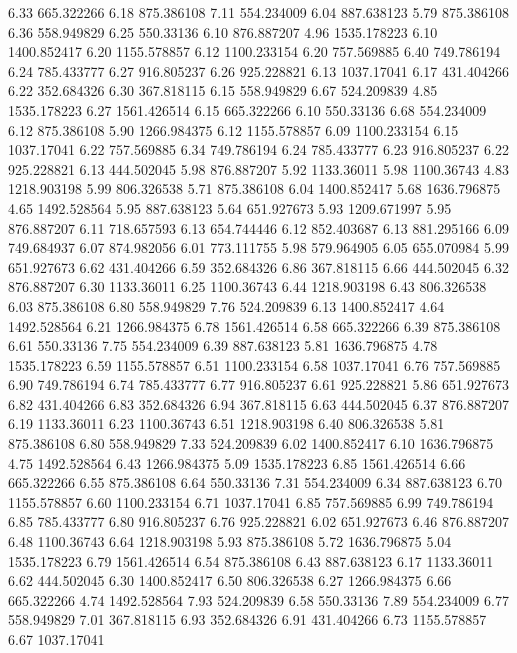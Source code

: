 6.33 	665.322266
6.18 	875.386108
7.11 	554.234009
6.04 	887.638123
5.79 	875.386108
6.36 	558.949829
6.25 	550.33136
6.10 	876.887207
4.96 	1535.178223
6.10 	1400.852417
6.20 	1155.578857
6.12 	1100.233154
6.20 	757.569885
6.40 	749.786194
6.24 	785.433777
6.27 	916.805237
6.26 	925.228821
6.13 	1037.17041
6.17 	431.404266
6.22 	352.684326
6.30 	367.818115
6.15 	558.949829
6.67 	524.209839
4.85 	1535.178223
6.27 	1561.426514
6.15 	665.322266
6.10 	550.33136
6.68 	554.234009
6.12 	875.386108
5.90 	1266.984375
6.12 	1155.578857
6.09 	1100.233154
6.15 	1037.17041
6.22 	757.569885
6.34 	749.786194
6.24 	785.433777
6.23 	916.805237
6.22 	925.228821
6.13 	444.502045
5.98 	876.887207
5.92 	1133.36011
5.98 	1100.36743
4.83 	1218.903198
5.99 	806.326538
5.71 	875.386108
6.04 	1400.852417
5.68 	1636.796875
4.65 	1492.528564
5.95 	887.638123
5.64 	651.927673
5.93 	1209.671997
5.95 	876.887207
6.11 	718.657593
6.13 	654.744446
6.12 	852.403687
6.13 	881.295166
6.09 	749.684937
6.07 	874.982056
6.01 	773.111755
5.98 	579.964905
6.05 	655.070984
5.99 	651.927673
6.62 	431.404266
6.59 	352.684326
6.86 	367.818115
6.66 	444.502045
6.32 	876.887207
6.30 	1133.36011
6.25 	1100.36743
6.44 	1218.903198
6.43 	806.326538
6.03 	875.386108
6.80 	558.949829
7.76 	524.209839
6.13 	1400.852417
4.64 	1492.528564
6.21 	1266.984375
6.78 	1561.426514
6.58 	665.322266
6.39 	875.386108
6.61 	550.33136
7.75 	554.234009
6.39 	887.638123
5.81 	1636.796875
4.78 	1535.178223
6.59 	1155.578857
6.51 	1100.233154
6.58 	1037.17041
6.76 	757.569885
6.90 	749.786194
6.74 	785.433777
6.77 	916.805237
6.61 	925.228821
5.86 	651.927673
6.82 	431.404266
6.83 	352.684326
6.94 	367.818115
6.63 	444.502045
6.37 	876.887207
6.19 	1133.36011
6.23 	1100.36743
6.51 	1218.903198
6.40 	806.326538
5.81 	875.386108
6.80 	558.949829
7.33 	524.209839
6.02 	1400.852417
6.10 	1636.796875
4.75 	1492.528564
6.43 	1266.984375
5.09 	1535.178223
6.85 	1561.426514
6.66 	665.322266
6.55 	875.386108
6.64 	550.33136
7.31 	554.234009
6.34 	887.638123
6.70 	1155.578857
6.60 	1100.233154
6.71 	1037.17041
6.85 	757.569885
6.99 	749.786194
6.85 	785.433777
6.80 	916.805237
6.76 	925.228821
6.02 	651.927673
6.46 	876.887207
6.48 	1100.36743
6.64 	1218.903198
5.93 	875.386108
5.72 	1636.796875
5.04 	1535.178223
6.79 	1561.426514
6.54 	875.386108
6.43 	887.638123
6.17 	1133.36011
6.62 	444.502045
6.30 	1400.852417
6.50 	806.326538
6.27 	1266.984375
6.66 	665.322266
4.74 	1492.528564
7.93 	524.209839
6.58 	550.33136
7.89 	554.234009
6.77 	558.949829
7.01 	367.818115
6.93 	352.684326
6.91 	431.404266
6.73 	1155.578857
6.67 	1037.17041
